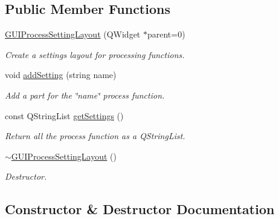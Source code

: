 \subsection*{Public Member Functions}
\begin{DoxyCompactItemize}
\item 
\mbox{\hyperlink{class_g_u_i_process_setting_layout_ab9b86381d47bad64c1b9af46880eeb42}{G\+U\+I\+Process\+Setting\+Layout}} (Q\+Widget $\ast$parent=0)
\begin{DoxyCompactList}\small\item\em Create a settings layout for processing functions. \end{DoxyCompactList}\item 
void \mbox{\hyperlink{class_g_u_i_process_setting_layout_a47c96c4baaed4082c55b0359b76e415f}{add\+Setting}} (string name)
\begin{DoxyCompactList}\small\item\em Add a part for the \char`\"{}name\char`\"{} process function. \end{DoxyCompactList}\item 
const Q\+String\+List \mbox{\hyperlink{class_g_u_i_process_setting_layout_a17b8110ccb32ba0dcd822ec6fd4f10ac}{get\+Settings}} ()
\begin{DoxyCompactList}\small\item\em Return all the process function as a Q\+String\+List. \end{DoxyCompactList}\item 
\mbox{\hyperlink{class_g_u_i_process_setting_layout_a71b9f40efeb993237ca10beb7f541e3f}{$\sim$\+G\+U\+I\+Process\+Setting\+Layout}} ()
\begin{DoxyCompactList}\small\item\em Destructor. \end{DoxyCompactList}\end{DoxyCompactItemize}


\subsection{Constructor \& Destructor Documentation}
\mbox{\label{class_g_u_i_process_setting_layout_ab9b86381d47bad64c1b9af46880eeb42}} 
